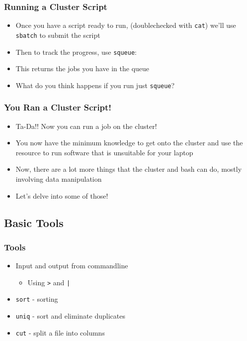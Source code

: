 \documentclass[14pt]{beamer}
\begin{document}
\begin{frame}
\frametitle{Running a Cluster Script}
\begin{itemize}
	\item Once you have a script ready to run, (doublechecked with \texttt{cat}) we'll use \texttt{sbatch} to submit the script
	\ttfamily
	\sffamily
	\normalsize
	\item Then to track the progress, use \texttt{squeue}:
	\ttfamily
	\normalsize
	\sffamily
	\item This returns the jobs you have in the queue
	\item What do you think happens if you run just \texttt{squeue}?
\end{itemize}
\end{frame}

\begin{frame}
\frametitle{You Ran a Cluster Script!}
\begin{itemize}
	\item<+-> Ta-Da!! Now you can run a job on the cluster!
	\item<+-> You now have the minimum knowledge to get onto the cluster and use the resource to run software that is unsuitable for your laptop
	\item<+-> Now, there are a lot more things that the cluster and bash can do, mostly involving data manipulation
	\item<+-> Let's delve into some of those!
\end{itemize}
\end{frame}

\subsection{Basic Tools}

\begin{frame}
\frametitle{Tools}
\begin{itemize}
	\item Input and output from commandline
	\begin{itemize}
		\item Using \texttt{>} and \texttt{|}
	\end{itemize}
	\sffamily
	\item \texttt{sort} - sorting
	\item \texttt{uniq} - sort and eliminate duplicates
	\item \texttt{cut} - split a file into columns
\end{itemize}
\end{frame}
\end{document}
